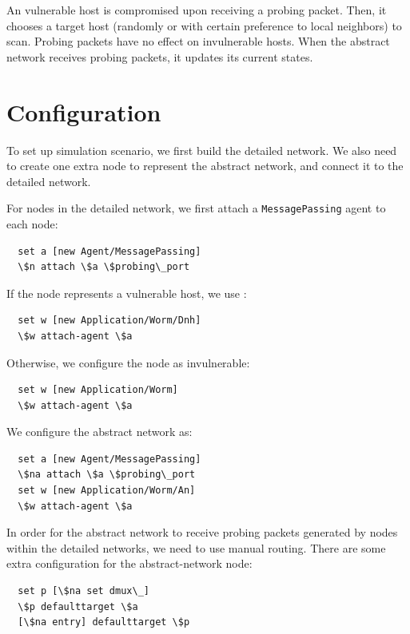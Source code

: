 An vulnerable host is compromised upon receiving a probing packet.
Then,
  it chooses a target host (randomly or with certain preference to local
  neighbors) to scan.
Probing packets have no effect on invulnerable hosts.
When the abstract network receives probing packets,
  it updates its current states.

\section{Configuration}
\label{sec:worm:config}

To set up simulation scenario,
  we first build the detailed network.
We also need to create one extra node to represent the abstract network, 
  and connect it to the detailed network.

For nodes in the detailed network,
  we first attach a {\tt MessagePassing} agent to each node:

\begin{verbatim}
  set a [new Agent/MessagePassing]
  \$n attach \$a \$probing\_port
\end{verbatim}

If the node represents a vulnerable host,
  we use :

\begin{verbatim}
  set w [new Application/Worm/Dnh]
  \$w attach-agent \$a
\end{verbatim}

Otherwise, we configure the node as invulnerable:
\begin{verbatim}
  set w [new Application/Worm]
  \$w attach-agent \$a
\end{verbatim}


We configure the abstract network as:

\begin{verbatim}
  set a [new Agent/MessagePassing]
  \$na attach \$a \$probing\_port
  set w [new Application/Worm/An]
  \$w attach-agent \$a
\end{verbatim}

In order for the abstract network to receive probing packets generated by
  nodes within the detailed networks,
  we need to use manual routing.
There are some extra configuration for the abstract-network node:

\begin{verbatim}
  set p [\$na set dmux\_]
  \$p defaulttarget \$a
  [\$na entry] defaulttarget \$p
\end{verbatim}


